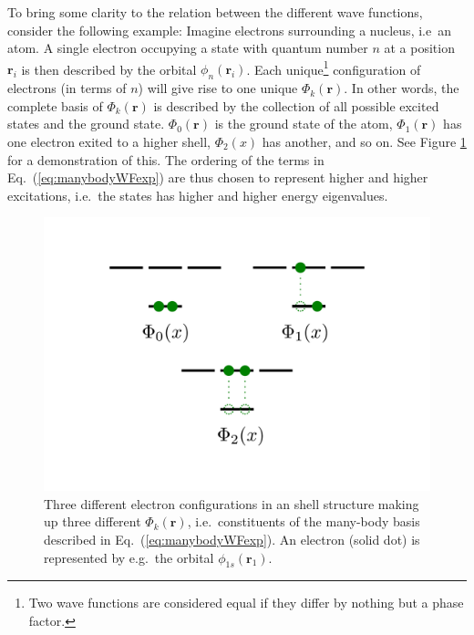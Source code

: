 To bring some clarity to the relation between the different wave functions, consider the following example: Imagine electrons surrounding a nucleus, i.e~an atom. A single electron occupying a state with quantum number $n$ at a position $\mathbf{r}_i$ is then described by the orbital $\phi_n(\mathbf{r}_i)$. Each unique\footnote{Two wave functions are considered equal if they differ by nothing but a phase factor.} configuration of electrons (in terms of $n$) will give rise to one unique $\Phi_k(\mathbf{r})$. In other words, the complete basis of $\Phi_k(\mathbf{r})$ is described by the collection of all possible excited states and the ground state. $\Phi_0(\mathbf{r})$ is the ground state of the atom, $\Phi_1(\mathbf{r})$ has one electron exited to a higher shell, $\Phi_2(x)$ has another, and so on. See Figure \ref{fig:AtomicOrbitals} for a demonstration of this. The ordering of the terms in Eq.~(\ref{eq:manybodyWFexp}) are thus chosen to represent higher and higher excitations, i.e.~the states has higher and 
higher energy eigenvalues.

\begin{figure}
 \begin{center}
  \includegraphics[scale=0.5]{../Graphics/shellStructure.pdf}
  \caption{Three different electron configurations in an shell structure making up three different $\Phi_k(\mathbf{r})$, i.e.~constituents of the many-body basis described in Eq.~(\ref{eq:manybodyWFexp}). An electron (solid dot) is represented by e.g.~the orbital $\phi_{1s}(\mathbf{r}_1)$.}
  \label{fig:AtomicOrbitals}
 \end{center}
\end{figure}

